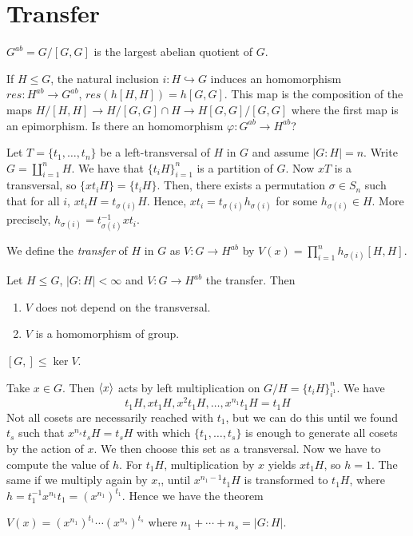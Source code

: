 \documentclass[twoside, 11pt]{article}
\begin{document}
\section{Transfer}
\begin{defi}
$G^{ab}=G/[G,G]$ is the largest abelian quotient of $G$.
\end{defi}
If $H\leq G$, the natural inclusion $i:H\hookrightarrow G$ induces an homomorphism $res: H^{ab}\to G^{ab}$, $res(h[H,H])=h[G,G]$. This map is the composition of the maps $H/[H,H]\to H/[G,G]\cap H\to H[G,G]/[G,G]$ where the first map is an epimorphism. Is there an homomorphism $\varphi:G^{ab}\to H^{ab}$?


Let $T=\{t_1,\dots, t_n\}$ be a left-transversal of $H$ in $G$ and assume $|G:H|=n$. Write $G=\coprod_{i=1}^nH$. We have that $\{t_iH\}_{i=1}^n$ is a partition of $G$. Now $xT$ is a transversal, so $\{xt_iH\}=\{t_iH\}$. Then, there exists a permutation $\sigma\in S_n$ such that for all $i$, $xt_iH=t_{\sigma(i)}H$. Hence, $xt_i=t_{\sigma(i)}h_{\sigma(i)}$ for some $h_{\sigma(i)}\in H$. More precisely, $h_{\sigma(i)}=t_{\sigma(i)}^{-1}xt_i$. 
\begin{defi}
We define the \emph{transfer} of $H$ in $G$ as $V:G\to H^{ab}$ by $V(x)=\prod_{i=1}^nh_{\sigma(i)}[H,H]$. 
\end{defi}

\begin{teorema}
Let $H\leq G$, $|G:H|<\infty$ and $V:G\to H^{ab}$ the transfer. Then
\begin{enumerate}
\item $V$ does not depend on the transversal. 
\item $V$ is a homomorphism of group. 
\end{enumerate}
\end{teorema}

\begin{coro}
$[G,]\leq \ker V$. 
\end{coro}

Take $x\in G$. Then $\langle{x}\rangle$ acts by left multiplication on $G/H=\{t_iH\}_{i^1}^n$. We have 
\[
t_1H,xt_1H, x^2t_1H,\dots, x^{n_1}t_1H=t_1H
\]
Not all cosets are necessarily reached with $t_1$, but we can do this until we found $t_s$ such that $x^{n_s}t_sH=t_sH$ with which $\{t_1,\dots, t_s\}$ is enough to generate all cosets  by the action of $x$. We then choose this set as a transversal. Now we have to compute the value of $h$. For $t_1H$, multiplication by $x$ yields $xt_1H$, so $h=1$. The same if we multiply again by $x$,, until $x^{n_1-1}t_1H$ is transformed to $t_1H$, where $h=t_1^{-1}x^{n_1}t_1=(x^{n_1})^{t_1}$. Hence we have the theorem
\begin{teorema}
$V(x)=(x^{n_1})^{t_1}\cdots (x^{n_s})^{t_s}$ where $n_1+\cdots+n_s=|G:H|$.
\end{teorema}
\end{document}
